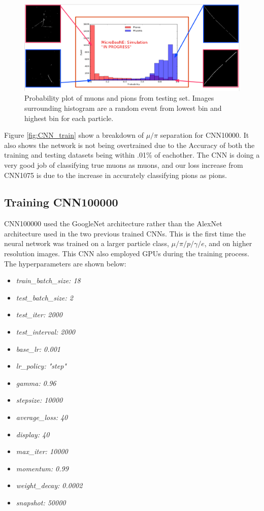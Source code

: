 \begin{figure}[htp!]
\includegraphics[width=\textwidth]{figs/mitch_hw.png}
\caption{Probability plot of muons and pions from testing set. Images surrounding histogram are a random event from lowest bin and highest bin for each particle.}
\label{fig:prob_plot}
\end{figure}

Figure \ref{fig:CNN_train} show a breakdown of $\mu/\pi$ separation for CNN10000. It also shows the network is not being overtrained due to the Accuracy of both the training and testing datasets being within .01\% of eachother. The CNN is doing a very good job of classifying true muons as muons, and our loss increase from CNN1075 is due to the increase in accurately classifying pions as pions. 



\subsection{Training CNN100000}
CNN100000 used the GoogleNet architecture rather than the AlexNet architecture used in the two previous trained CNNs. This is the first time the neural network was trained on a larger particle class, $\mu/\pi/p/\gamma/e$, and on higher resolution images. This CNN also employed GPUs during the training process. The hyperparameters are shown below:

\begin{multicols}{2}
\begin{itemize}
 \item \textit{train{\_}batch{\_}size: 18}
 \item \textit{test{\_}batch{\_}size: 2}
 \item \textit{test{\_}iter: 2000}
 \item \textit{test{\_}interval: 2000}
 \item \textit{base{\_}lr: 0.001}
 \item \textit{lr{\_}policy: "step"}
 \item \textit{gamma: 0.96}
 \item \textit{stepsize: 10000}
 \item \textit{average{\_}loss: 40}
 \item \textit{display: 40}
 \item \textit{max{\_}iter: 10000}
 \item \textit{momentum: 0.99}
 \item \textit{weight{\_}decay: 0.0002}
 \item \textit{snapshot: 50000}
\end{itemize}
\end{multicols}


